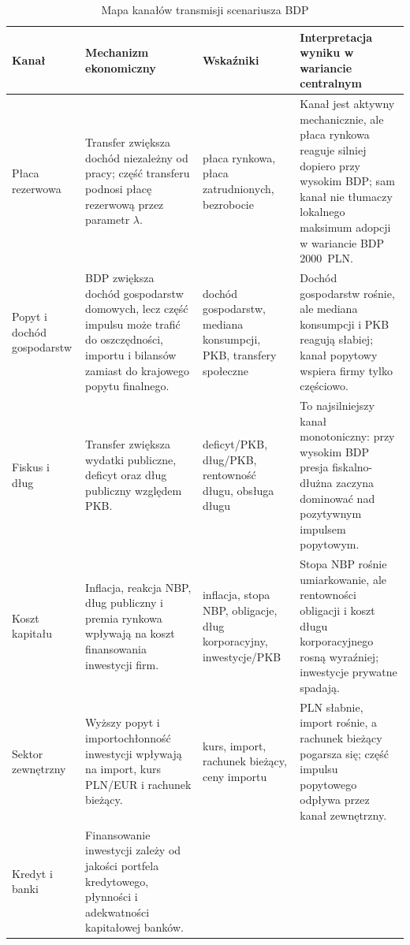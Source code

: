 \begin{table}[htbp]
\centering
\scriptsize
\caption{Mapa kanałów transmisji scenariusza BDP}
\label{tab:transmission-channels}
\begin{tabularx}{\textwidth}{@{}>{\raggedright\arraybackslash}p{}>{\raggedright\arraybackslash}p{}>{\raggedright\arraybackslash}p{}>{\raggedright\arraybackslash}X@{}}
\toprule
\textbf{Kanał} & \textbf{Mechanizm ekonomiczny} & \textbf{Wskaźniki} & \textbf{Interpretacja wyniku w wariancie centralnym} \\
\midrule
Płaca rezerwowa &
Transfer zwiększa dochód niezależny od pracy; część transferu podnosi płacę rezerwową przez parametr \(\lambda\). &
płaca rynkowa, płaca zatrudnionych, bezrobocie &
Kanał jest aktywny mechanicznie, ale płaca rynkowa reaguje silniej dopiero przy wysokim BDP; sam kanał nie tłumaczy lokalnego maksimum adopcji w wariancie BDP 2000~PLN. \\
\addlinespace
Popyt i dochód gospodarstw &
BDP zwiększa dochód gospodarstw domowych, lecz część impulsu może trafić do oszczędności, importu i bilansów zamiast do krajowego popytu finalnego. &
dochód gospodarstw, mediana konsumpcji, PKB, transfery społeczne &
Dochód gospodarstw rośnie, ale mediana konsumpcji i PKB reagują słabiej; kanał popytowy wspiera firmy tylko częściowo. \\
\addlinespace
Fiskus i dług &
Transfer zwiększa wydatki publiczne, deficyt oraz dług publiczny względem PKB. &
deficyt/PKB, dług/PKB, rentowność długu, obsługa długu &
To najsilniejszy kanał monotoniczny: przy wysokim BDP presja fiskalno-dłużna zaczyna dominować nad pozytywnym impulsem popytowym. \\
\addlinespace
Koszt kapitału &
Inflacja, reakcja NBP, dług publiczny i premia rynkowa wpływają na koszt finansowania inwestycji firm. &
inflacja, stopa NBP, obligacje, dług korporacyjny, inwestycje/PKB &
Stopa NBP rośnie umiarkowanie, ale rentowności obligacji i koszt długu korporacyjnego rosną wyraźniej; inwestycje prywatne spadają. \\
\addlinespace
Sektor zewnętrzny &
Wyższy popyt i importochłonność inwestycji wpływają na import, kurs PLN/EUR i rachunek bieżący. &
kurs, import, rachunek bieżący, ceny importu &
PLN słabnie, import rośnie, a rachunek bieżący pogarsza się; część impulsu popytowego odpływa przez kanał zewnętrzny. \\
\addlinespace
Kredyt i banki &
Finansowanie inwestycji zależy od jakości portfela kredytowego, płynności i adekwatności kapitałowej banków. &

\end{tabularx}
\end{table}
